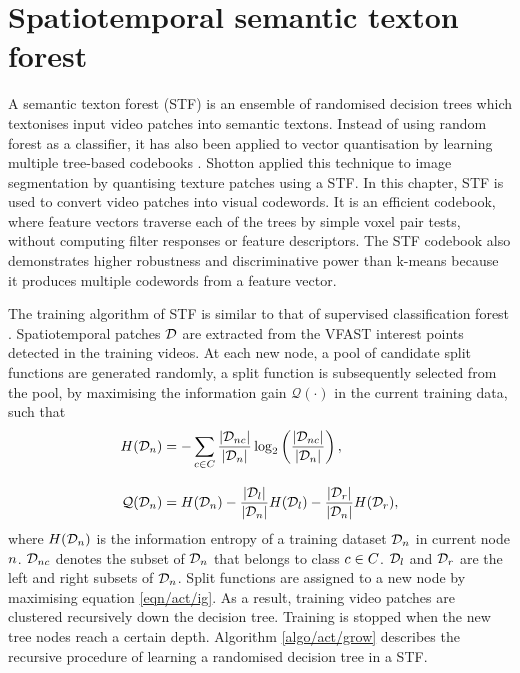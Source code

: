 
\section{Spatiotemporal semantic texton forest}
\label{sec/act/stf}

A semantic texton forest (STF) is an ensemble of randomised decision trees which textonises input video patches into semantic textons. Instead of using random forest as a classifier, it has also been applied to vector quantisation by learning multiple tree-based codebooks \cite{Moosmann2007}. Shotton \etal \cite{Shotton2008} applied this technique to image segmentation by quantising texture patches using a STF. In this chapter, STF is used to convert video patches into visual codewords.  
It is an efficient codebook, where feature vectors traverse each of the trees by simple voxel pair tests, without computing filter responses or feature descriptors. The STF codebook also demonstrates higher robustness and discriminative power than k-means because it produces multiple codewords from a feature vector. 

The training algorithm of STF is similar to that of supervised classification forest \cite{Breiman2001}. Spatiotemporal patches $\mathcal{D}$ are extracted from the VFAST interest points detected in the training videos. 
At each new node, a pool of candidate split functions are generated randomly, a split function is subsequently selected from the pool, by maximising the information gain $\mathcal{Q}(\cdot)$ in the current training data, such that 
\begin{equation}
	\begin{aligned}
		H(\mathcal{D}_{n}) & = -\sum_{c \in C} \frac{|\mathcal{D}_{n c}|}{|\mathcal{D}_{n}|}\log_{2}\left(\frac{|\mathcal{D}_{n c}|}{|\mathcal{D}_{n}|}\right),\\[3mm] 
		\mathcal{Q}(\mathcal{D}_{n}) & = H(\mathcal{D}_{n}) - \frac{|\mathcal{D}_{l}|}{|\mathcal{D}_{n}|}H(\mathcal{D}_{l}) - \frac{|\mathcal{D}_{r}|}{|\mathcal{D}_{n}|}H(\mathcal{D}_{r}),
	\end{aligned}
	\label{eqn/act/ig}
\end{equation}
where $H(\mathcal{D}_{n})$ is the information entropy of a training dataset $\mathcal{D}_{n}$ in current node $n$. $\mathcal{D}_{n c}$ denotes the subset of $\mathcal{D}_{n}$ that belongs to class $c \in C$. $\mathcal{D}_{l}$ and $\mathcal{D}_{r}$ are the left and right subsets of $\mathcal{D}_{n}$.
Split functions are assigned to a new node by maximising equation \ref{eqn/act/ig}. As a result, training video patches are clustered recursively down the decision tree. Training is stopped when the new tree nodes reach a certain depth. Algorithm \ref{algo/act/grow} describes the recursive procedure of learning a randomised decision tree in a STF.

